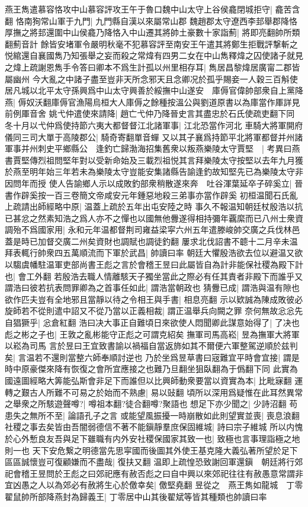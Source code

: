 燕王雋遣慕容恪攻中山慕容評攻王午于魯口魏中山太守上谷侯龕閉城拒守|{
	龕苦含翻}
恪南狥常山軍于九門|{
	九門縣自漢以來屬常山郡}
魏趙郡太守遼西李邽舉郡降恪厚撫之將邽還圍中山侯龕乃降恪入中山遷其將帥土豪數十家詣薊|{
	將即亮翻帥所類翻薊音計}
餘皆安堵軍令嚴明秋毫不犯慕容評至南安王午遣其將鄭生拒戰評撃斬之悦綰還自襄國雋乃知張舉之妄而殺之常煒有四男二女在中山雋釋煒之囚使諸子就見之煒上疏謝恩雋手令答曰卿本不爲生計孤以州里相存耳|{
	雋居昌黎煒居廣甯二郡皆屬幽州}
今大亂之中諸子盡至豈非天所念邪天且念卿况於孤乎賜妾一人穀三百斛使居凡城以北平太守孫興爲中山太守興善於綏撫中山遂安　庫傉官偉帥部衆自上黨降燕|{
	傉奴沃翻庫傉官漁陽烏桓大人庫傉之餘種按溫公與劉道原書以為庫當作厙詳見前例厙音舍}
姚弋仲遣使來請降|{
	趙亡弋仲乃降晉史言其盡忠於石氏使疏吏翻下同}
冬十月以弋仲爲使持節六夷大都督督江北諸軍事|{
	江北恐當作河北}
車騎大將軍開府儀同三司大單于高陵郡公|{
	騎奇寄翻單音蟬}
又以其子襄爲持節平北將軍都督并州諸軍事并州刺史平鄉縣公　逢釣亡歸渤海招集舊衆以叛燕樂陵太守賈堅　|{
	考異曰燕書賈堅傳烈祖問堅年對以受新命始及三載烈祖悦其言拜樂陵太守按堅以去年九月獲於燕至明年始三年若未為樂陵太守豈能安集諸縣告諭逢釣故知堅先已為樂陵太守非因問年而授}
使人告諭鄉人示以成敗釣部衆稍散遂來奔　吐谷渾葉延卒子碎奚立|{
	晉書作辟奚按一百三卷簡文帝咸安元年鍾惡地殺三弟事亦當作辟奚}
初桓温聞石氏亂上疏請出師經略中原|{
	温蓋上疏於五年出屯安陸之時}
事久不報温知朝廷杖殷浩以抗已甚忿之然素知浩之爲人亦不之憚也以國無他釁遂得相持彌年覊縻而已八州士衆資調殆不爲國家用|{
	永和元年温都督荆司雍益梁寜六州五年遣滕峻帥交廣之兵伐林邑蓋是時已加督交廣二州矣資財也調賦也調徒釣翻}
屢求北伐詔書不聼十二月辛未温拜表輒行帥衆四五萬順流而下軍於武昌|{
	帥讀曰率}
朝廷大懼殷浩欲去位以避温又欲以騶虞幡駐温軍吏部尚書王彪之言於會稽王昱曰此屬皆自為計非能保社稷為殿下計也|{
	會工外翻}
若殷浩去職人情離駭天子獨坐當此之際必有任其責者非殿下而誰乎又謂浩曰彼若抗表問罪卿為之首事任如此|{
	謂浩當朝政也}
猜釁已成|{
	謂浩與温有隙也}
欲作匹夫豈有全地邪且當靜以待之令相王與手書|{
	相息亮翻}
示以欵誠為陳成敗彼必旋師若不從則遣中詔又不從乃當以正義相裁|{
	謂正温舉兵向闕之罪}
奈何無故忩忩先自猖獗乎|{
	忩倉紅翻}
浩曰决大事正自難頃日來欲使人悶聞卿此謀意始得了|{
	了决也}
彪之彬之子也|{
	王敦之亂彬能守正彪之可謂克紹矣}
撫軍司馬高崧|{
	昱為撫軍大將軍以崧為司馬}
言於昱曰王宜致書諭以禍福自當返斾如其不爾便六軍整駕逆順於兹判矣|{
	言温若不還則當整六師奉順討逆也}
乃於坐爲昱草書曰宼難宜平時會宜接|{
	謂是時中原豪傑來降有恢復之會所宜應接之也難乃旦翻坐狙臥翻為于僞翻下同}
此實為國遠圖經略大筭能弘斯會非足下而誰但以比興師動衆要當以資實為本|{
	比毗寐翻}
運轉之艱古人所難不可易之於始而不熟慮|{
	易以䜴翻}
頃所以深用爲疑惟在此耳然異常之舉衆之所駭遊聲噂?|{
	噂祖本翻?徒合翻噂?聚語也}
想足下亦少聞之|{
	少詩沼翻}
苟患失之無所不至|{
	論語孔子之言}
或能望風振擾一時崩散如此則望實並喪|{
	喪息浪翻}
社稷之事去矣皆由吾闇弱德信不著不能鎭靜羣庶保固維城|{
	詩曰宗子維城}
所以内愧於心外慙良友吾與足下雖職有内外安社稷保國家其致一也|{
	致極也言事理詣極之地則一也}
天下安危繋之明德當先思寜國而後圖其外使王基克隆大義弘著所望於足下區區誠懷豈可復顧嫌而不盡哉|{
	復扶又翻}
温即上疏惶恐致謝回軍還鎭　朝廷將行郊祀會稽王昱問於王彪之曰郊祀應有赦否彪之曰自中興以來郊祀往往有赦愚意常謂非宜凶愚之人以為郊必有赦將生心於儌幸矣|{
	儌堅堯翻}
昱從之　燕王雋如龍城　丁零翟鼠帥所部降燕封為歸義王|{
	丁零居中山其後翟斌等皆其種類也帥讀曰率}


